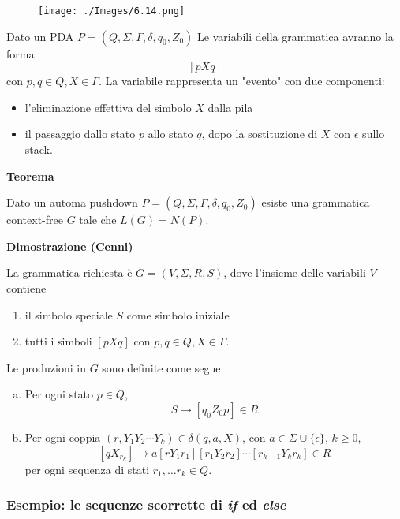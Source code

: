 \begin{figure}[hbpt!]
    \centering
    \texttt{[image: ./Images/6.14.png]}
\end{figure}
\FloatBarrier

Dato un PDA $P=\left(Q, \Sigma, \Gamma, \delta, q_{0}, Z_{0}\right)$ Le variabili della grammatica avranno la forma
$$
[p X q]
$$
con $p, q \in Q, X \in \Gamma$.
La variabile rappresenta un "evento" con due componenti:
\begin{itemize}
    \item l'eliminazione effettiva del simbolo $X$ dalla pila
    \item il passaggio dallo stato $p$ allo stato $q$, dopo la sostituzione di $X$ con $\epsilon$ sullo stack.
\end{itemize}

\textbf{Teorema}

Dato un automa pushdown $P=\left(Q, \Sigma, \Gamma, \delta, q_{0}, Z_{0}\right)$ esiste una grammatica context-free $G$ tale che $L(G)=N(P)$.

\vspace{5mm}

\textbf{Dimostrazione (Cenni)}

La grammatica richiesta è $G=(V, \Sigma, R, S)$, dove l'insieme delle variabili $V$ contiene
\begin{enumerate}
    \item il simbolo speciale $S$ come simbolo iniziale
    \item tutti i simboli $[p X q]$ con $p, q \in Q, X \in \Gamma$.
\end{enumerate}
Le produzioni in $G$ sono definite come segue:
\begin{enumerate}[(a)]
    \item Per ogni stato $p \in Q$,
$$
S \rightarrow\left[q_{0} Z_{0} p\right] \in R
$$
    \item Per ogni coppia $\left(r, Y_{1} Y_{2} \cdots Y_{k}\right) \in \delta(q, a, X)$, con $a \in \Sigma \cup\{\epsilon\}$, $k \geq 0$,
$$
\left[q X_{r_{k}}\right] \rightarrow a\left[r Y_{1} r_{1}\right]\left[r_{1} Y_{2} r_{2}\right] \cdots\left[r_{k-1} Y_{k} r_{k}\right] \in R
$$
per ogni sequenza di stati $r_{1}, \ldots r_{k} \in Q$.
\end{enumerate}

\subsubsection{Esempio: le sequenze scorrette di \textit{if} ed \textit{else}}

